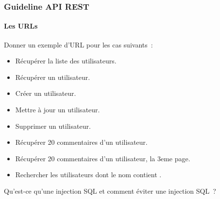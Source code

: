 \documentclass{beamer}
\begin{document}
    \begin{frame}
        \transdissolve
        \frametitle{Guideline API REST}
        \framesubtitle{Les URLs}
        Donner un exemple d'URL pour les cas suivants~:
        \begin{itemize}
            \item Récupérer la liste des utilisateurs.
            \item Récupérer un utilisateur.
            \item Créer un utilisateur.
            \item Mettre à jour un utilisateur.
            \item Supprimer un utilisateur.
            \item Récupérer 20 commentaires d'un utilisateur.
            \item Récupérer 20 commentaires d'un utilisateur, la 3eme page.
            \item Rechercher les utilisateurs dont le nom contient .
        \end{itemize}
        \pause
        \bigbreak
        Qu'est-ce qu'une injection SQL et comment éviter une injection SQL~?
    \end{frame}
\end{document}
